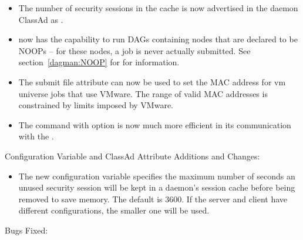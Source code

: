 \begin{itemize}
\item The number of security sessions in the cache is now advertised in
the daemon ClassAd as .

\item {} now has the capability to run DAGs containing nodes
that are declared to be NOOPs -- for these nodes, a job is never actually
submitted.  See section~\ref{dagman:NOOP} for for information.

\item The submit file attribute  can now be used to set
the MAC address for vm universe jobs that use VMware. The range of valid
MAC addresses is constrained by limits imposed by VMware.

\item The  command with option 
is now much more efficient in its communication with the .

\end{itemize}

\noindent Configuration Variable and ClassAd Attribute Additions and Changes:

\begin{itemize}

\item The new configuration variable
   specifies the maximum
  number of seconds an unused security session will be kept in a daemon's
  session cache before being removed to save memory.  The default is 3600.
  If the server and client have different configurations, the smaller
  one will be used.

\end{itemize}

\noindent Bugs Fixed:

